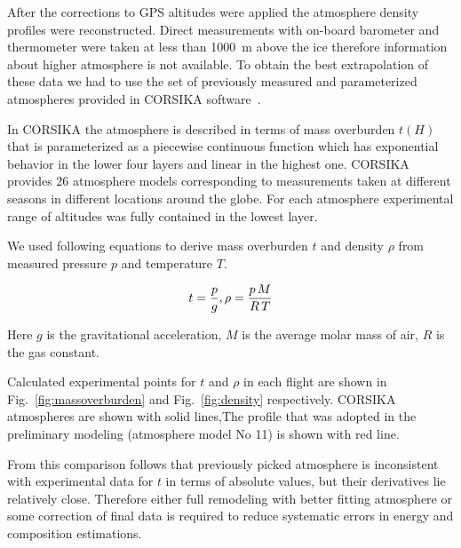 \documentclass[final,5p,times,twocolumn]{elsarticle}
\begin{document}

After the corrections to GPS altitudes were applied the atmosphere density profiles were reconstructed. Direct measurements with on-board barometer and thermometer were taken at less than 1000~m above the ice therefore information about higher atmosphere is not available. To obtain the best extrapolation of these data we had to use the set of previously measured and parameterized atmospheres provided in CORSIKA software~\cite{hec98}.

In CORSIKA the atmosphere is described in terms of mass overburden $t(H)$ that is parameterized as a piecewise continuous function which has exponential behavior in the lower four layers and linear in the highest one. %
CORSIKA provides 26 atmosphere models corresponding to measurements taken at different seasons in different locations around the globe. For each atmosphere experimental range of altitudes was fully contained in the lowest layer.

We used following equations to derive mass overburden $t$ and density $\rho$ from measured pressure $p$ and temperature $T$.

\begin{equation}
t     = \frac{p}{g}, \\
\rho  = \frac{p \, M}{R \, T} \\
\end{equation}

Here $g$ is the gravitational acceleration, $M$ is the average molar mass of air, $R$ is the gas constant.

Calculated experimental points for $t$ and $\rho$ in each flight are shown in Fig.~\ref{fig:massoverburden} and Fig.~\ref{fig:density} respectively. CORSIKA atmospheres are shown with solid lines,The profile that was adopted in the preliminary modeling (atmosphere model No 11) is shown with red line.

From this comparison follows that previously picked atmosphere is inconsistent with experimental data for $t$ in terms of absolute values, but their derivatives lie relatively close. Therefore either full remodeling with better fitting atmosphere or some correction of final data is required to reduce systematic errors in energy and composition estimations.
\end{document}
